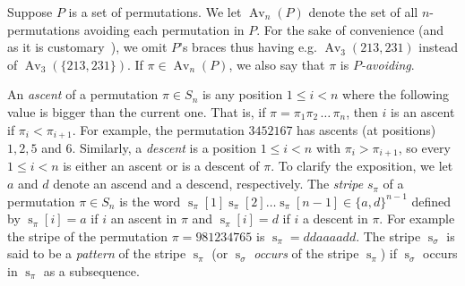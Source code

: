 \documentclass[a4paper]{llncs}
\DeclareMathOperator{\AV}{Av}
\DeclareMathOperator{\stripea}{s}
\newcommand{\stripe}[2]{\stripea_{{#1}}[{#2}]}
\newcommand{\stripew}[1]{\stripea_{{#1}}}
\newcommand{\dstep}{d}
\newcommand{\ustep}{a}
\begin{document}
Suppose $P$ is a set of permutations. We let $\AV_n(P)$ denote the
set of all $n$-permutations avoiding each permutation in $P$.
For the sake of convenience
(and as it is customary~\cite{Kitaev:book:2011}), we omit $P$'s braces thus having
e.g. $\AV_3(213,231)$ instead of
$\AV_3(\{213,231\})$.
If $\pi \in \AV_n(P)$, we also say that $\pi$ is
\emph{$P$-avoiding}.

An \emph{ascent} of a permutation $\pi \in S_n$ is any position
$1 \leq i < n$ where the following value is bigger than the current one.
That is, if $\pi = \pi_1\pi_2\,\ldots\,\pi_n$, then
$i$ is an ascent if $\pi_i < \pi_{i+1}$.
For example, the permutation
$345216$7 has ascents (at positions) $1,2,5$ and $6$.
Similarly, a \emph{descent} is a position
$1 \leq i < n$ with $\pi_i > \pi_{i+1}$,
so every $1 \leq i < n$  is either an ascent or is a descent of
$\pi$.
To clarify the exposition,
we let $\ustep$ and $\dstep$ denote an ascend and a descend, respectively.
The \emph{stripe} $s_\pi$ of a permutation $\pi \in S_n$ is the word
$\stripe{\pi}{1} \stripe{\pi}{2} \ldots \stripe{\pi}{n-1} \in \{\ustep,\dstep\}^{n-1}$
defined by
$ \stripe{\pi}{i}= \ustep$ if $i$ an ascent in $\pi$ and
$\stripe{\pi}{i} = \dstep$ if $i$ a descent in $\pi$.
For example the stripe of the permutation
$\pi = 981234765$
is $\stripew{\pi} = \dstep\dstep\ustep\ustep\ustep\ustep\dstep\dstep$.
The stripe $\stripew{\sigma}$ is said to be a \emph{pattern} of the stripe $\stripew{\pi}$
(or $\stripew{\sigma}$ \emph{occurs} of the stripe $\stripew{\pi}$)
if $\stripew{\sigma}$ occurs in $\stripew{\pi}$ as a subsequence.
\end{document}
